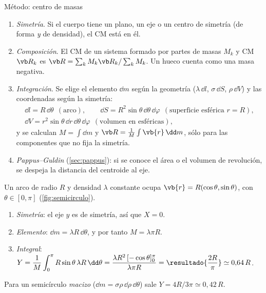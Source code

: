 \begin{clave}{Método: centro de masas}
\begin{enumerate}[leftmargin=1.4em]
  \item \emph{Simetría}. Si el cuerpo tiene un plano, un eje o un centro de
        simetría (de forma \emph{y} de densidad), el CM está en él.
  \item \emph{Composición}. El CM de un sistema formado por partes de masas
        $M_{k}$ y CM $\Rc_{k}$ es $\Rc=\sum_{k}M_{k}\Rc_{k}/\sum_{k}M_{k}$. Un hueco
        cuenta como una masa negativa.
  \item \emph{Integración}. Se elige el elemento $\dd m$ según la geometría
        ($\lambda\,\dd l$, $\sigma\,\dd S$, $\rho\,\dd V$) y las coordenadas según la simetría:
        \begin{gather*}
          \dd l=R\,\dd\theta\ \ (\text{arco}),\qquad
          \dd S=R^{2}\sin\theta\,\dd\theta\,\dd\varphi\ \ (\text{superficie esférica }r=R),\\
          \dd V=r^{2}\sin\theta\,\dd r\,\dd\theta\,\dd\varphi\ \ (\text{volumen en esféricas}),
        \end{gather*}
        y se calculan $M=\int\dd m$ y $\Rc=\frac1M\int\vb{r}\,\dd m$, sólo para las
        componentes que no fija la simetría.
  \item \emph{Pappus--Guldin} (\cref{sec:pappus}): si se conoce el área o el
        volumen de revolución, se despeja la distancia del centroide al eje.
\end{enumerate}
\end{clave}

\begin{ejemplo}
\label{ej:semicirculo}
Un arco de radio $R$ y densidad $\lambda$ constante ocupa
$\vb{r}=R(\cos\theta,\sin\theta)$, con $\theta\in[0,\pi]$ (\cref{fig:semicirculo}).
\begin{enumerate}
  \item \emph{Simetría}: el eje $y$ es de simetría, así que $X=0$.
  \item \emph{Elemento}: $\dd m=\lambda R\,\dd\theta$, y por tanto $M=\lambda\pi R$.
  \item \emph{Integral}:
  $Y=\dfrac{1}{M}\displaystyle\int_{0}^{\pi}R\sin\theta\,\lambda R\,\dd\theta
  =\dfrac{\lambda R^{2}\,[-\cos\theta]_{0}^{\pi}}{\lambda\pi R}=\resultado{\dfrac{2R}{\pi}}\simeq0{,}64\,R$.
\end{enumerate}
Para un semicírculo \emph{macizo} ($\dd m=\sigma\rho\,\dd\rho\,\dd\theta$) sale $Y=4R/3\pi\simeq0{,}42\,R$.
\end{ejemplo}


